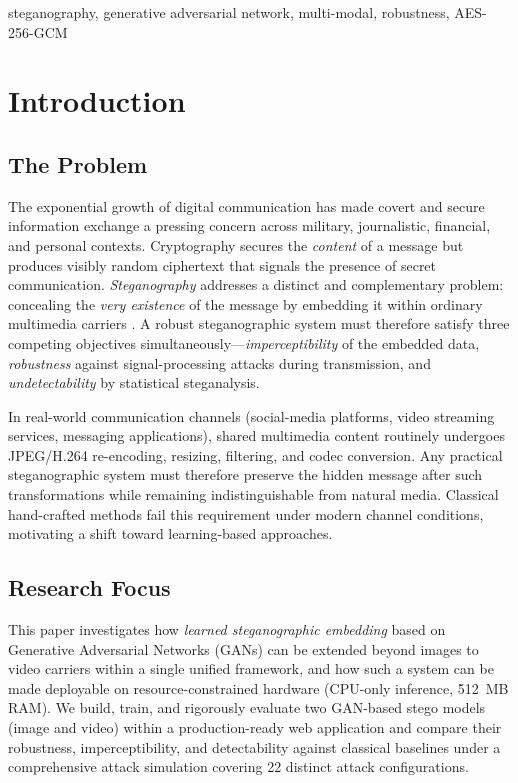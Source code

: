 \documentclass[conference]{IEEEtran}
\begin{document}
\begin{IEEEkeywords}
steganography, generative adversarial network, multi-modal,
robustness, AES-256-GCM
\end{IEEEkeywords}

\section{Introduction}

\subsection{The Problem}

The exponential growth of digital communication has made covert and
secure information exchange a pressing concern across military,
journalistic, financial, and personal contexts. Cryptography secures
the \textit{content} of a message but produces visibly random
ciphertext that signals the presence of secret communication.
\textit{Steganography} addresses a distinct and complementary problem:
concealing the \textit{very existence} of the message by embedding it
within ordinary multimedia carriers \cite{b9}. A robust
steganographic system must therefore satisfy three competing
objectives simultaneously—\textit{imperceptibility} of the embedded
data, \textit{robustness} against signal-processing attacks during
transmission, and \textit{undetectability} by statistical steganalysis.

In real-world communication channels (social-media platforms, video
streaming services, messaging applications), shared multimedia content
routinely undergoes JPEG/H.264 re-encoding, resizing, filtering, and
codec conversion. Any practical steganographic system must therefore
preserve the hidden message after such transformations while remaining
indistinguishable from natural media. Classical hand-crafted methods
fail this requirement under modern channel conditions, motivating a
shift toward learning-based approaches.

\subsection{Research Focus}

This paper investigates how \textit{learned steganographic embedding}
based on Generative Adversarial Networks (GANs) can be extended
beyond images to video carriers within a single unified
framework, and how such a system can be made deployable on
resource-constrained hardware (CPU-only inference, 512~MB RAM). We
build, train, and rigorously evaluate two GAN-based stego models
(image and video) within a production-ready web application and
compare their robustness, imperceptibility, and detectability against
classical baselines under a comprehensive attack simulation covering
22 distinct attack configurations.
\end{document}
